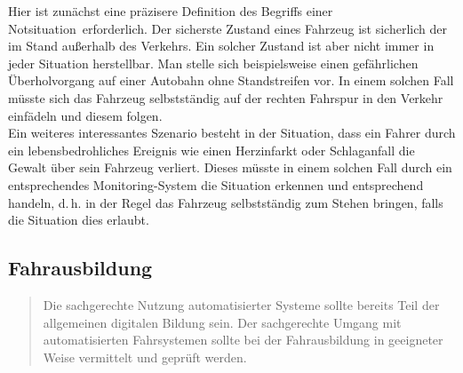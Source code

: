 \documentclass[twoside,a4paper,12pt]{article}
\begin{document}
Hier ist zunächst eine präzisere Definition des Begriffs einer \glqq Notsituation\grqq\ erforderlich. Der sicherste Zustand eines Fahrzeug ist sicherlich der im Stand
außerhalb des Verkehrs. Ein solcher Zustand ist aber nicht immer in jeder Situation herstellbar. Man stelle sich beispielsweise einen gefährlichen Überholvorgang
auf einer Autobahn ohne Standstreifen vor. In einem solchen Fall müsste sich das Fahrzeug selbstständig auf der rechten Fahrspur in den Verkehr einfädeln und 
diesem folgen.\\

Ein weiteres interessantes Szenario besteht in der Situation, dass ein Fahrer durch ein lebensbedrohliches Ereignis wie einen Herzinfarkt oder Schlaganfall
die Gewalt über sein Fahrzeug verliert. Dieses müsste in einem solchen Fall durch ein entsprechendes Monitoring-System die Situation erkennen und entsprechend
\glqq handeln\grqq, d.\,h. in der Regel das Fahrzeug selbstständig zum Stehen bringen, falls die Situation dies erlaubt.

\subsection{Fahrausbildung} \label{Fahrausbildung}

\begin{quote}
\glqq
Die sachgerechte Nutzung automatisierter Systeme sollte bereits Teil der allgemeinen digitalen Bildung sein. Der sachgerechte 
Umgang mit automatisierten Fahrsystemen sollte
bei der Fahrausbildung in geeigneter Weise vermittelt und geprüft werden.\grqq\mbox{~\cite[S. 13]{ek}}
\end{quote}
\end{document}
